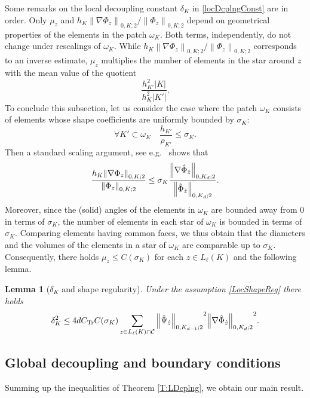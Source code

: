 \documentclass[a4paper]{amsart}
\numberwithin{equation}{section}
\theoremstyle{plain}
\newtheorem{lem}{Lemma}[section]
\theoremstyle{definition}
\begin{document}
Some remarks on the local decoupling constant ${\delta}_{K}$ in
\eqref{locDcplngConst} are in order.  Only $\mu_z$ and
$h_{K} {{\left\|{{{\nabla}{\Phi}_z}}\right\|_{{0,{K};2}}}} /
{{\left\|{{{\Phi}_z}}\right\|_{{0,{K};2}}}}$ depend on geometrical properties of the
elements in the patch $\omega_{K}$.  Both terms, independently, do
not change under rescalings of $\omega_{K}$.  While
$h_{K} {{\left\|{{{\nabla}{\Phi}_z}}\right\|_{{0,{K};2}}}} /
{{\left\|{{{\Phi}_z}}\right\|_{{0,{K};2}}}}$ corresponds to an inverse
estimate, $\mu_z$ multiplies the number of elements in the star around
$z$ with the mean value of the quotient
\[
 \frac{h_{{K}'}^2{\left|{K}\right|}}{h_{K}^2{\left|{{K}'}\right|}}.
\]
To conclude this subsection, let us consider the case where the patch
$\omega_{K}$ consists of elements whose shape coefficients are
uniformly bounded by $\sigma_{K}$:
\begin{equation}
\label{LocShapeReg}
 \forall {K}'\subset\omega_{K}
\quad
 \frac{h_{{K}'}}{\rho_{{K}'}}
 \leq
 \sigma_{K}.
\end{equation}
Then a standard scaling argument, see e.g.\ \cite[(4.5.3)]{Brenner.Scott:08} 
shows that
\[
 \frac{h_{K} {{\left\|{{{\nabla}{\Phi}_z}}\right\|_{{0,{K};2}}}}}
  {{{\left\|{{{\Phi}_z}}\right\|_{{0,{K};2}}}}}
 \leq
 \sigma_{K}
 \frac{{{\left\|{{{\nabla}\Hat{\Phi}_{\Hat z}}}\right\|_{{0,{{{K}_d}};2}}}}}
  {{{\left\|{{\Hat{\Phi}_{\Hat z}}}\right\|_{{0,{{{K}_d}};2}}}}}.
\]
Moreover, since the (solid) angles of the elements in $\omega_{K}$ are bounded 
away from 0 in terms of $\sigma_{K}$, the number of elements in each star of 
$\omega_K$ is bounded in terms of $\sigma_{K}$. Comparing elements having 
common faces, we thus obtain that the diameters and the volumes of the elements
in a star of $\omega_{K}$ are comparable up to $\sigma_{K}$.  Consequently, 
there holds $\mu_z\leq C(\sigma_{K})$ for each $z\in{L_{{\ell}}}({K})$ 
and the following lemma.

\begin{lem}[${\delta}_{K}$ and shape regularity]
Under the assumption \eqref{LocShapeReg} there holds
\[
 {\delta}_{K}^2
 \leq
 4 d {{C_\text{Tr}}}
 C(\sigma_{K})
 \sum_{z\in{L_{{\ell}}}({K})\cap{\mathcal{C}}}
  {{\left\|{{\Hat{\Psi}_{\Hat z}}}\right\|_{{0,{{K}_{d-1}};2}}}}^2
  {{\left\|{{{\nabla}\Hat{\Phi}_{\Hat z}}}\right\|_{{0,{{{K}_d}};2}}}}^2.
\]
\end{lem}

\subsection{Global decoupling and boundary conditions}
Summing up the inequalities of Theorem \ref{T:LDcplng}, we obtain our main 
result.
\end{document}
